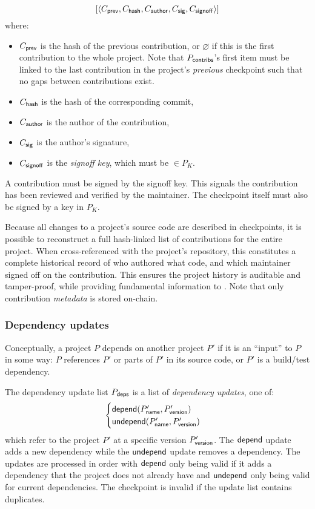 \[
    [\langle C_{\mathsf{prev}}, C_{\mathsf{hash}}, C_{\mathsf{author}}, C_{\mathsf{sig}}, C_{\mathsf{signoff}}\rangle]
\]
where:
\begin{itemize}
    \item $C_{\mathsf{prev}}$ is the hash of the previous contribution, or
      $\varnothing$ if this is the first contribution to the whole
      project. Note that $P_{\mathsf{contribs}}$'s first item must be linked to the last
      contribution in the project's \emph{previous} checkpoint such that no
      gaps between contributions exist.
    \item $C_{\mathsf{hash}}$ is the hash of the corresponding commit,
    \item $C_{\mathsf{author}}$ is the author of the contribution,
    \item $C_{\mathsf{sig}}$ is the author's signature,
    \item $C_{\mathsf{signoff}}$ is the \emph{signoff key}, which must be $\in P_K$.
\end{itemize}

A contribution must be signed by the signoff key. This signals
the contribution has been reviewed and verified by the maintainer. The
checkpoint itself must also be signed by a key in $P_K$.

Because all changes to a project's source code are described in checkpoints, it
is possible to reconstruct a full hash-linked list of contributions for the
entire project. When cross-referenced with the project's repository, this
constitutes a complete historical record of who authored what code, and which
maintainer signed off on the contribution. This ensures the project history is
auditable and tamper-proof, while providing fundamental information to
\osrank{}. Note that only contribution \emph{metadata} is stored
on-chain.

\subsubsection{Dependency updates}
\label{s:checkpoint-deps}
Conceptually, a project $P$ depends on another project $P'$ if it is an
``input'' to $P$ in some way: $P$ references $P'$ or parts of $P'$ in its
source code, or $P'$ is a build/test dependency.

The dependency update list $P_{\mathsf{deps}}$ is a list of \emph{dependency
  updates}, one of:
\[
    \begin{cases}
        \mathsf{depend}(P'_{\mathsf{name}}, P'_{\mathsf{version}}) \\
        \mathsf{undepend}(P'_{\mathsf{name}}, P'_{\mathsf{version}})
    \end{cases}
\]
which refer to the project $P'$ at a specific version $P'_{\mathsf{version}}$.
The $\mathsf{depend}$ update adds a new dependency while the $\mathsf{undepend}$ update removes
a dependency. The updates are processed in order with $\mathsf{depend}$ only being
valid if it adds a dependency that the project does not already have and
$\mathsf{undepend}$ only being valid for current dependencies. The checkpoint is
invalid if the update list contains duplicates.

